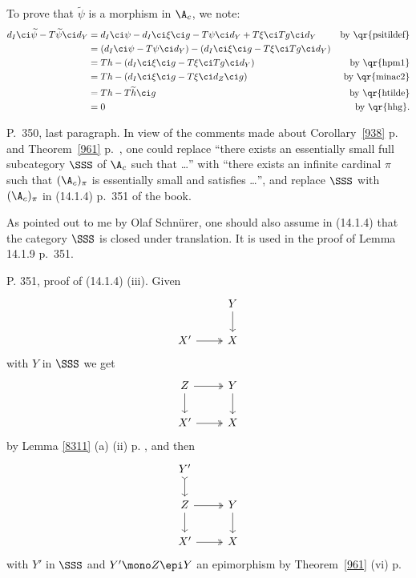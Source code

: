\documentclass[12pt]{article}
\theoremstyle{remark}
\theoremstyle{definition}
\begin{document}
To prove that $\widetilde\psi$ is a morphism in $\A_c$, we note: 
\begin{align*}
d_I\ci\widetilde\psi-T\widetilde\psi\ci d_Y&=d_I\ci\psi-d_I\ci\xi\ci g-T\psi\ci d_Y+T\xi\ci Tg\ci d_Y&\text{by \qr{psitildef}}\\ 
&=(d_I\ci\psi-T\psi\ci d_Y)-(d_I\ci\xi\ci g-T\xi\ci Tg\ci d_Y)\\ 
&=Th-(d_I\ci\xi\ci g-T\xi\ci Tg\ci d_Y)&\text{by \qr{hpm1}}\\ 
&=Th-(d_I\ci\xi\ci g-T\xi\ci d_Z\ci g)&\text{by \qr{minac2}}\\ 
&=Th-T\widetilde h\ci g&\text{by \qr{htilde}}\\ 
&=0&\text{by \qr{hhg}}. 
\end{align*}



\begin{s} 
P.~350, last paragraph. In view of the comments made about Corollary~\ref{938} p.~ and Theorem~\ref{961} p.~, one could replace ``there exists an essentially small full subcategory $\SSS$ of $\A_c$ such that \dots'' with ``there exists an infinite cardinal $\pi$ such that $(\A_c)_\pi$ is essentially small and satisfies \dots'', and replace $\SSS$ with $(\A_c)_\pi$ in (14.1.4) p.~351 of the book.
\end{s}

\begin{s} 
As pointed out to me by Olaf Schnürer, one should also assume in (14.1.4) that the category $\SSS$ is closed under translation. It is used in the proof of Lemma 14.1.9 p.~351. %
\end{s}

\begin{s}
P. 351, proof of (14.1.4) (iii). Given 
$$
\begin{tikzcd}
&Y\ar[d]\\ 
X'\ar[r,two heads]&X
\end{tikzcd}
$$ 
with $Y$ in $\SSS$ we get 
$$
\begin{tikzcd}
Z\ar[d]\ar[r,two heads]&Y\ar[d]\\ 
X'\ar[r,two heads]&X
\end{tikzcd}
$$ 
by Lemma \ref{8311} (a) (ii) p. , and then 
$$
\begin{tikzcd}
Y'\ar[d,rightarrowtail]\\ 
Z\ar[d]\ar[r,two heads]&Y\ar[d]\\ 
X'\ar[r,two heads]&X
\end{tikzcd}
$$ 
with $Y'$ in $\SSS$ and $Y'\mono Z\epi Y$ an epimorphism by Theorem~\ref{961} (vi) p.~
\end{s}
\end{document}
